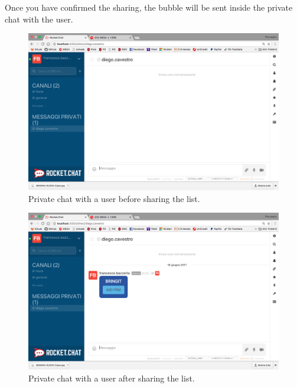 Once you have confirmed the sharing, the bubble will be sent inside the private chat with the user.

\begin{figure}[H]
  \centering 
  \includegraphics[width=\textwidth]{Sections/3-HowToUse/Images/share_user_before.png}
  \caption{Private chat with a user before sharing the list.}
\end{figure}

\begin{figure}[H]
  \centering 
  \includegraphics[width=\textwidth]{Sections/3-HowToUse/Images/share_user_after.png}
  \caption{Private chat with a user after sharing the list.}
\end{figure}


